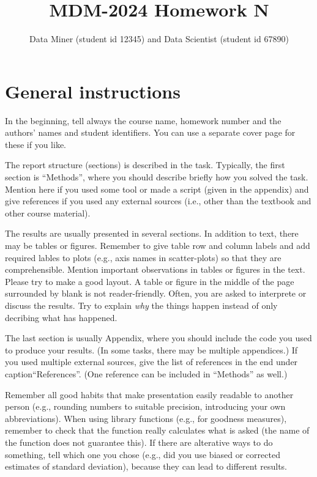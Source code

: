 \documentclass[a4paper,12pt]{article}
\title{MDM-2024 Homework N}
\author{Data Miner (student id 12345) and Data Scientist (student id 67890)}
\begin{document}
\maketitle

\section{General instructions}

In the beginning, tell always the course name, homework number and 
the authors' names and student identifiers. You can use a separate cover 
page for these if you like.

The report structure (sections) is described in the task.  Typically,
the first section is ``Methods'', where you should describe briefly
how you solved the task. Mention here if you used some tool or made a
script (given in the appendix) and give references if you used any
external sources (i.e., other than the textbook and other course
material).

The results are usually presented in several sections. In addition to
text, there may be tables or figures.  Remember to give table row and
column labels and add required lables to plots (e.g., axis names in
scatter-plots) so that they are comprehensible. Mention important
observations in tables or figures in the text. Please try to make a
good layout. A table or figure in the middle of the page surrounded by
blank is not reader-friendly. Often, you are asked to interprete or
discuss the results. Try to explain {\em why} the things happen
instead of only decribing what has happened.

The last section is usually Appendix, where you should include the
code you used to produce your results. (In some tasks, there may be
multiple appendices.) If you used multiple external sources, give the
list of references in the end under caption``References''. (One
reference can be included in ``Methods'' as well.)


Remember all good habits that make presentation easily readable to
another person (e.g., rounding numbers to suitable precision,
introducing your own abbreviations). When using library functions
(e.g., for goodness measures), remember to check that the function
really calculates what is asked (the name of the function does not
guarantee this). If there are alterative ways to do something, tell
which one you chose (e.g., did you use biased or corrected estimates
of standard deviation), because they can lead to different results.
\end{document}
